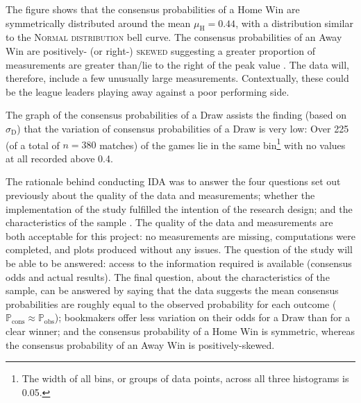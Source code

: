 \documentclass[a4paper,10pt]{report}
\begin{document}
The figure shows that the consensus probabilities of a Home Win are symmetrically distributed around the mean $\mu_{\textrm{H}}=0.44$, with a distribution similar to the \textsc{Normal distribution} bell curve. The consensus probabilities of an Away Win are positively- (or right-) \textsc{skewed} suggesting a greater proportion of measurements are greater than/lie to the right of the peak value \autocite{Mendenhall13}. The data will, therefore, include a few  unusually large measurements. Contextually, these could be the league leaders playing away against a poor performing side.

The graph of the consensus probabilities of a Draw assists the finding (based on $\sigma_{\textrm{D}}$) that the variation of consensus probabilities of a Draw is very low: Over 225 (of a total of $n=380$ matches) of the games lie in the same bin\footnote{The width of all bins, or groups of data points, across all three histograms is 0.05.} with no values at all recorded above 0.4.\vspace{3mm}

The rationale behind conducting IDA was to answer the four questions set out previously about the quality of the data and measurements; whether the implementation of the study fulfilled the intention of the research design; and the characteristics of the sample \autocite{Ader08}. The quality of the data and measurements are both acceptable for this project: no measurements are missing, computations were completed, and plots produced without any issues. The question of the study will be able to be answered: access to the information required is available (consensus odds and actual results). The final question, about the characteristics of the sample, can be answered by saying that the data suggests the mean consensus probabilities are roughly equal to the observed probability for each outcome ($\mathbb{P}_{\textrm{cons}} \approx \mathbb{P}_{\textrm{obs}}$); bookmakers offer less variation on their odds for a Draw than for a clear winner; and the consensus probability of a Home Win is symmetric, whereas the consensus probability of an Away Win is positively-skewed.
\end{document}
